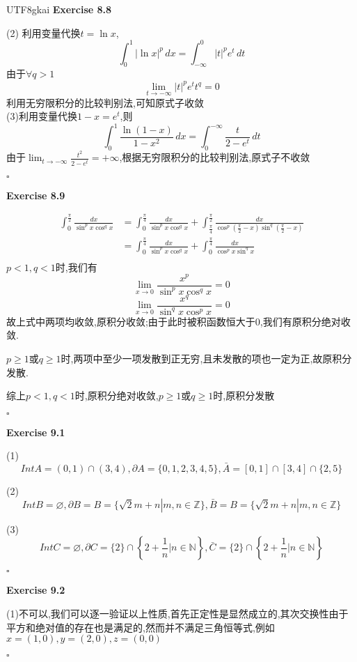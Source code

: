 \documentclass{article}
\newenvironment{exercise}[1]{%
{\textbf{Exercise #1} \\ 
    }
}{
  \hfill $\square$ 
  \par\bigskip 
}
\newcommand{\NN}{\mathbb{N}}
\newcommand{\ZZ}{\mathbb{Z}}
\begin{document}
\begin{CJK}{UTF8}{gkai}
\begin{exercise}{8.8}
    (2)
    利用变量代换$t = \ln x$,
    \[\int_{0}^{1}|\ln x|^p \, dx = \int_{-\infty}^{0}|t|^p e^t\, dt\]
    由于$\forall q > 1$
    \[\lim_{t\to - \infty}|t|^p e^t t^q = 0\]
    利用无穷限积分的比较判别法,可知原式子收敛\\

    (3)利用变量代换$1 - x = e^t$,则
    \[\int_{0}^{1}\frac{\ln (1 - x)}{1 - x^2} \, dx = \int_{0}^{-\infty}\frac{t}{2 - e^t}\, dt\]
    由于$\lim_{t \to -\infty} \frac{t^2}{2 - e^t} = + \infty$,根据无穷限积分的比较判别法,原式子不收敛
\end{exercise}

\begin{exercise}{8.9}
    \[
        \begin{aligned}
            \int_{0}^{\frac{\pi}{2}} \frac{dx}{\sin^p x \cos^q x} &= \int_{0}^{\frac{\pi}{4}} \frac{dx}{\sin^p x \cos^q x} + \int_{\frac{\pi}{4}}^{\frac{\pi}{2}} \frac{dx}{\cos^p (\frac{\pi}{2}- x) \sin^q (\frac{\pi}{2}- x)}\\
            &= \int_{0}^{\frac{\pi}{4}} \frac{dx}{\sin^p x \cos^q x} + \int_{0}^{\frac{\pi}{4}} \frac{dx}{\cos^p x \sin^q x}\\
        \end{aligned}
    \]
    $p < 1,q < 1$时,我们有
    \[\lim_{x\to 0} \frac{x^p}{\sin^p x \cos^q x} = 0\]
    \[\lim_{x\to 0} \frac{x^q}{\sin^q x \cos^p x} = 0\]
    故上式中两项均收敛,原积分收敛;由于此时被积函数恒大于0,我们有原积分绝对收敛.

    $p \geq 1$或$q \geq 1$时,两项中至少一项发散到正无穷,且未发散的项也一定为正,故原积分发散.

    综上$p < 1,q < 1$时,原积分绝对收敛,$p \geq 1$或$q \geq 1$时,原积分发散
\end{exercise}

\begin{exercise}{9.1}
    (1)\[Int A = (0,1)\cap (3,4), \partial A = \{0,1,2,3,4,5\}, \bar{A} = [0,1]\cap[3,4]\cap\{2,5\}\]

    (2)\[Int B = \varnothing, \partial B = B = \{\sqrt{2}m + n|m,n \in \ZZ\},\bar{B} = B = \{\sqrt{2}m + n|m,n \in \ZZ\}\]

    (3)\[Int C = \varnothing, \partial C = \{2\}\cap\left\{2 + \frac{1}{n}|n \in \NN\right\},\bar{C} = \{2\}\cap\left\{2 + \frac{1}{n}|n \in \NN\right\}\]
\end{exercise}

\begin{exercise}{9.2}
    (1)不可以,我们可以逐一验证以上性质,首先正定性是显然成立的,其次交换性由于平方和绝对值的存在也是满足的,然而并不满足三角恒等式,例如$x = (1,0),y = (2,0),z = (0,0)$


\end{exercise}
\end{CJK}
\end{document}
